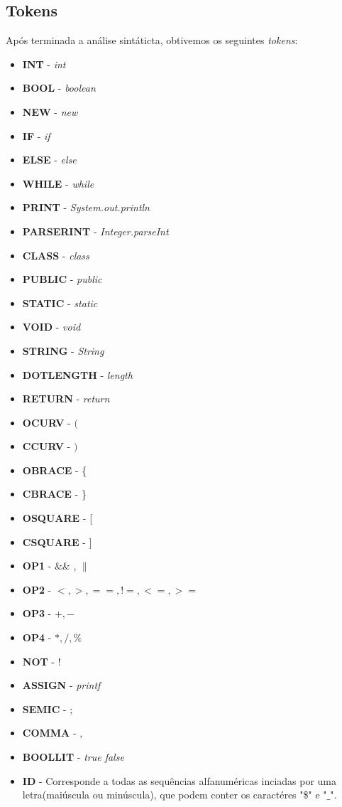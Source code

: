 \documentclass[11pt,a4paper]{article}
\begin{document}
\subsection{Tokens}

Após terminada a análise sintáticta, obtivemos os seguintes \emph{tokens}:

\begin{itemize}
	\item \textbf{INT} - \emph{int} 
	\item \textbf{BOOL} - \emph{boolean}
	\item \textbf{NEW} - \emph{new}
	\item \textbf{IF} - \emph{if}
	\item \textbf{ELSE} - \emph{else}
	\item \textbf{WHILE} - \emph{while}
	\item \textbf{PRINT} - \emph{System.out.println}
	\item \textbf{PARSERINT} - \emph{Integer.parseInt}
	\item \textbf{CLASS} - \emph{class}
	\item \textbf{PUBLIC} - \emph{public}
	\item \textbf{STATIC} - \emph{static}
	\item \textbf{VOID} - \emph{void}
	\item \textbf{STRING} - \emph{String}
	\item \textbf{DOTLENGTH} - \emph{length}
	\item \textbf{RETURN} - \emph{return}
	\item \textbf{OCURV} - $($
	\item \textbf{CCURV} - $)$
	\item \textbf{OBRACE} - \{
	\item \textbf{CBRACE} - \}
	\item \textbf{OSQUARE} - [
	\item \textbf{CSQUARE} - ]
	\item \textbf{OP1} - \&\& , $\|$
	\item \textbf{OP2} - $< , > , == , != , <= , >=$
	\item \textbf{OP3} - $+ , -$
	\item \textbf{OP4} - $* , / , \% $
	\item \textbf{NOT} - !
	\item \textbf{ASSIGN} - \emph{printf}
	\item \textbf{SEMIC} - ;
	\item \textbf{COMMA} - ,
	\item \textbf{BOOLLIT} - \emph{true false}
	\item \textbf{ID} - Corresponde a todas as sequências alfanuméricas inciadas por uma letra(maiúscula ou minúscula), que podem conter os caractéres "\$" e "$\_$".
\end{itemize}
\end{document}
